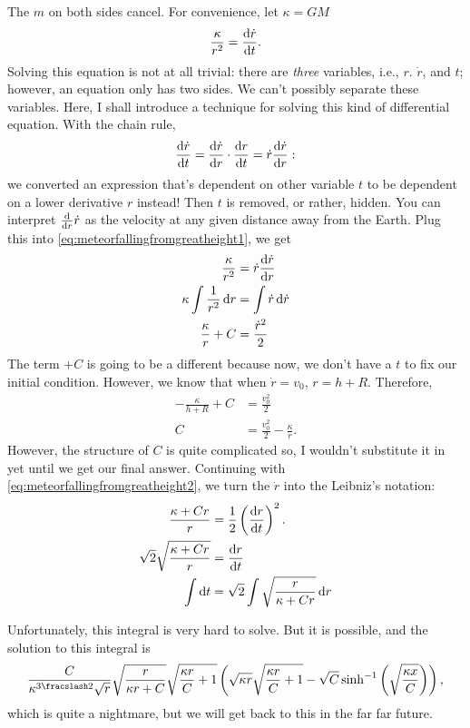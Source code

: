 The $m$ on both sides cancel. For convenience, let $\kappa = GM$
\begin{equation}
    \frac{\kappa}{r^2} = \odv{\dot{r}}{t}. \label{eq:meteorfallingfromgreatheight1}
\end{equation}
Solving this equation is not at all trivial: there are \emph{three} variables, i.e., $r$. $\dot{r}$, and $t$; however, an equation only has two sides. We can't possibly separate these variables. Here, I shall introduce a technique for solving this kind of differential equation. With the chain rule,
\begin{equation*}
    \odv{\dot{r}}{t} = \odv{\dot{r}}{r} \cdot \odv{r}{t} = \dot{r}\odv{\dot{r}}{r}:
\end{equation*}
we converted an expression that's dependent on other variable $t$ to be dependent on a lower derivative $r$ instead! Then $t$ is removed, or rather, hidden. You can interpret $\odv*{\dot{r}}{r}$ as the velocity at any given distance away from the Earth. Plug this into \cref{eq:meteorfallingfromgreatheight1}, we get
\begin{align}
    \frac{\kappa}{r^2} &= \dot{r}\odv{\dot{r}}{r} \nonumber\\
    \kappa\int\frac{1}{r^2}\odif{r} &= \int\dot{r}\odif{\dot{r}} \nonumber\\
    \frac{\kappa}{r} + C &= \frac{\dot{r}^2}{2} \label{eq:meteorfallingfromgreatheight2}
\end{align}
The term $+C$ is going to be a different because now, we don't have a $t$ to fix our initial condition. However, we know that when $\dot{r} = v_0$, $r = h + R$. Therefore,
\begin{align*}
    -\frac{\kappa}{h + R} + C &= \frac{v_0^2}{2} \\
    C &= \frac{v_0^2}{2} - \frac{\kappa}{r}.
\end{align*}
However, the structure of $C$ is quite complicated so, I wouldn't substitute it in yet until we get our final answer. Continuing with \cref{eq:meteorfallingfromgreatheight2}, we turn the $\dot{r}$ into the Leibniz's notation:
\begin{align*}
    \frac{\kappa + Cr}{r} &= \frac{1}{2}\left(\odv{r}{t}\right)^2. \\
    \sqrt{2}\sqrt{\frac{\kappa + Cr}{r}} &= \odv{r}{t} \\
    \int\odif{t} &= \sqrt{2}\int\sqrt{\frac{r}{\kappa + Cr}}\odif{r}
\end{align*}

Unfortunately, this integral is very hard to solve. But it is possible, and the solution to this integral is
\begin{equation*}
    \frac{C}{\kappa^{\flatfrac{3}{2}}\sqrt{r}}\sqrt{\frac{r}{\kappa r + C}}\sqrt{\frac{\kappa r}{C} + 1} \left(\sqrt{\kappa r}\sqrt{\frac{\kappa r}{C} + 1} - \sqrt{C}\sinh^{-1}\left(\sqrt{\frac{\kappa x}{C}}\right)\right),
\end{equation*}
which is quite a nightmare, but we will get back to this in the far far future.

